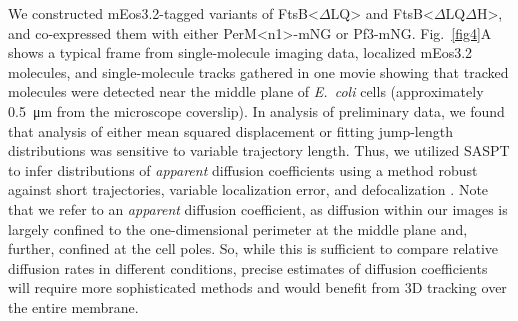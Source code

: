 \documentclass[twocolumn,pdflatex,sn-nature]{sn-jnl}%
\def\textsuperscript#1{<#1>}%
\newcommand\ec{\textit{E.~coli}}
\newcommand\ftsbdLQ{FtsB\textsuperscript{$\Delta{}$LQ}}
\newcommand\ftsbdLQdH{FtsB\textsuperscript{$\Delta{}$LQ$\Delta{}$H}}
\newcommand\permN{PerM\textsuperscript{n1}}
\begin{document}
We constructed mEos3.2-tagged variants of \ftsbdLQ{} and \ftsbdLQdH{}, and co-expressed them with either \permN{}-mNG or Pf3-mNG.
Fig.~\ref{fig4}A shows a typical frame from single-molecule imaging data, localized mEos3.2 molecules, and single-molecule tracks gathered in one movie showing that tracked molecules were detected near the middle plane of \ec{} cells (approximately \qty{0.5}{\um} from the microscope coverslip).
In analysis of preliminary data, we found that analysis of either mean squared displacement or fitting jump-length distributions was sensitive to variable trajectory length.
Thus, we utilized SASPT \citep{heckertRecoveringMixturesFastdiffusing2022a} to infer distributions of \textit{apparent} diffusion coefficients using a method robust against short trajectories, variable localization error, and defocalization \cite{hansenRobustModelbasedAnalysis2018a}.
Note that we refer to an \textit{apparent} diffusion coefficient, as diffusion within our images is largely confined to the one-dimensional perimeter at the middle plane and, further, confined at the cell poles.
So, while this is sufficient to compare relative diffusion rates in different conditions, precise estimates of diffusion coefficients will require more sophisticated methods and would benefit from 3D tracking over the entire membrane.
\end{document}
